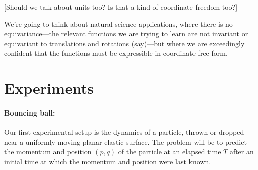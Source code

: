 \documentclass[12pt]{article}
\begin{document}
[Should we talk about units too? Is that a kind of coordinate freedom too?]

We're going to think about natural-science applications, where there is no equivariance---the relevant functions we are trying to learn are not invariant or equivariant to translations and rotations (say)---but where we are exceedingly confident that the functions must be expressible in coordinate-free form.

\section{Experiments}

\paragraph{Bouncing ball:}
Our first experimental setup is the dynamics of a particle, thrown or dropped near a uniformly moving planar elastic surface.
The problem will be to predict the momentum and position $(p,q)$ of the particle at an elapsed time $T$ after an initial time at which the momentum and position were last known.
\end{document}
